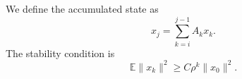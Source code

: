 \documentclass{article}
\begin{document}
We define the accumulated state as
\begin{equation}
  \label{eq:accumulation}
  x_j = \sum_{k=i}^{j-1} A_k x_k.
\end{equation}
The stability condition is
\begin{equation}
  \label{eq:stability}
  \mathbb{E}\|x_k\|^2 \geq C\rho^k\|x_0\|^2.
\end{equation}
\end{document}
